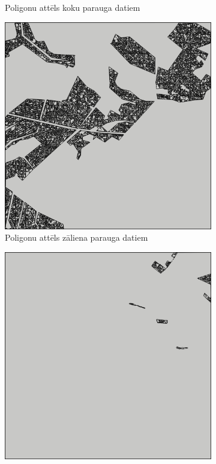 \documentclass[12pt,paper=a4]{report}
\begin{document}
\begin{figure}[h!]
\begin{subfigure}[b]{.3\linewidth}
\caption{Poligonu attēls koku parauga datiem}
\label{fig:kokiPoly}
\end{subfigure}
\begin{subfigure}[b]{.3\linewidth}
\includegraphics[width=\linewidth]{zaliensPolygons}
\caption{Poligonu attēls zāliena parauga datiem}\label{fig:zaliensPoly}
\end{subfigure}
\begin{subfigure}[b]{.3\linewidth}
\includegraphics[width=\linewidth]{lauksPolygons}

\end{subfigure}
\end{figure}
\end{document}
